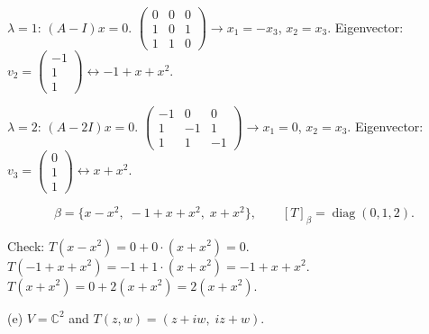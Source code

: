 \documentclass{article}
\begin{document}
\begin{mdframed}[linewidth=1pt]
$\lambda = 1$: $(A-I)x = 0$. $\begin{pmatrix}0&0&0\\1&0&1\\1&1&0\end{pmatrix} \to x_1 = -x_3$, $x_2 = x_3$. Eigenvector: $v_2 = \begin{pmatrix}-1\\1\\1\end{pmatrix} \leftrightarrow -1 + x + x^2$.

$\lambda = 2$: $(A-2I)x = 0$. $\begin{pmatrix}-1&0&0\\1&-1&1\\1&1&-1\end{pmatrix} \to x_1 = 0$, $x_2 = x_3$. Eigenvector: $v_3 = \begin{pmatrix}0\\1\\1\end{pmatrix} \leftrightarrow x + x^2$.

\[
\boxed{\beta = \{x - x^2,\; -1 + x + x^2,\; x + x^2\}, \qquad [T]_\beta = \operatorname{diag}(0, 1, 2).}
\]

\textnormal{Check:} $T(x - x^2) = 0 + 0 \cdot (x+x^2) = 0$. $T(-1+x+x^2) = -1 + 1\cdot(x+x^2) = -1+x+x^2$. $T(x+x^2) = 0 + 2(x+x^2) = 2(x+x^2)$.\end{mdframed}

\bigskip

\noindent\textnormal{(e)} $V = \mathbb{C}^2$ and $T(z,w) = (z + iw,\; iz + w)$.
\end{document}
